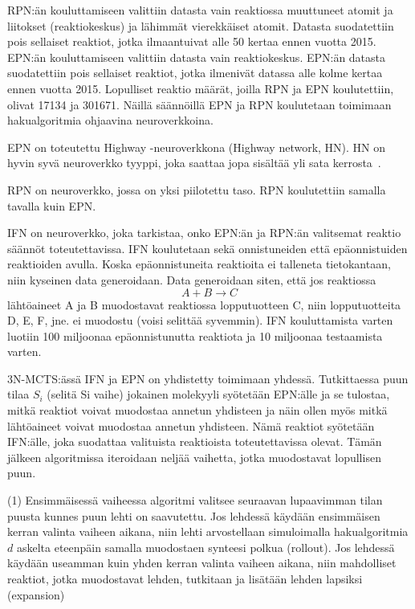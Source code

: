 \documentclass[finnish,twoside,censored,subject,sw-line]{HYthesisML}
\begin{document}
RPN:än kouluttamiseen valittiin datasta vain reaktiossa muuttuneet atomit ja liitokset (reaktiokeskus)
ja lähimmät vierekkäiset atomit. Datasta suodatettiin pois sellaiset reaktiot, jotka ilmaantuivat
alle 50 kertaa ennen vuotta 2015. EPN:än kouluttamiseen valittiin datasta vain reaktiokeskus.
EPN:än datasta suodatettiin pois sellaiset reaktiot, jotka ilmenivät datassa alle kolme kertaa ennen vuotta
2015. Lopulliset reaktio määrät, joilla RPN ja EPN koulutettiin, olivat 17134 ja 301671. Näillä säännöillä
EPN ja RPN koulutetaan toimimaan hakualgoritmia ohjaavina neuroverkkoina.

EPN on toteutettu Highway -neuroverkkona (Highway network, HN). HN on hyvin syvä neuroverkko
tyyppi, joka saattaa jopa sisältää yli sata kerrosta~\cite{VeryDeepNetworks}.

RPN on neuroverkko, jossa on yksi piilotettu taso. RPN koulutettiin samalla tavalla kuin EPN.

IFN on neuroverkko, joka tarkistaa, onko EPN:än ja RPN:än valitsemat reaktio säännöt toteutettavissa.
IFN koulutetaan sekä onnistuneiden että epäonnistuiden reaktioiden avulla. Koska epäonnistuneita
reaktioita ei talleneta tietokantaan, niin kyseinen data generoidaan. Data generoidaan siten, että jos reaktiossa
\[A + B \rightarrow C\] lähtöaineet A ja B muodostavat reaktiossa lopputuotteen C, niin lopputuotteita
D, E, F, jne. ei muodostu (voisi selittää syvemmin). IFN kouluttamista varten luotiin 100 miljoonaa
epäonnistunutta reaktiota ja 10 miljoonaa testaamista varten.

3N-MCTS:ässä IFN ja EPN on yhdistetty toimimaan yhdessä. Tutkittaessa puun tilaa $S_i$ (selitä Si vaihe) jokainen
molekyyli syötetään EPN:älle ja se tulostaa, mitkä reaktiot voivat muodostaa annetun yhdisteen ja näin ollen
myös mitkä lähtöaineet voivat muodostaa annetun yhdisteen. Nämä reaktiot syötetään IFN:älle, joka suodattaa
valituista reaktioista toteutettavissa olevat. Tämän jälkeen algoritmissa iteroidaan neljää vaihetta, jotka
muodostavat lopullisen puun.

(1) Ensimmäisessä vaiheessa algoritmi valitsee seuraavan lupaavimman tilan puusta kunnes puun lehti on saavutettu.
Jos lehdessä käydään ensimmäisen kerran valinta vaiheen aikana, niin lehti arvostellaan simuloimalla hakualgoritmia
$d$ askelta eteenpäin samalla muodostaen synteesi polkua (rollout). Jos lehdessä käydään useamman kuin yhden
kerran valinta vaiheen aikana, niin mahdolliset reaktiot, jotka muodostavat lehden, tutkitaan ja lisätään lehden
lapsiksi (expansion)
\end{document}
